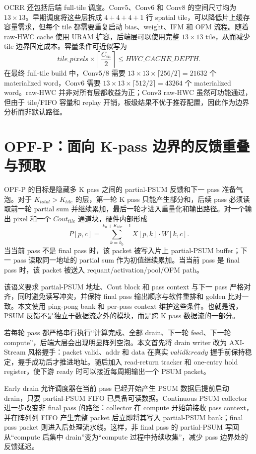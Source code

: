 OCRR 还包括后端 full-tile 调度。Conv5、Conv6 和 Conv8 的空间尺寸均为 $13\times13$。早期调度将这些层拆成 $4+4+4+1$ 行 spatial tile，可以降低片上缓存容量需求，但每个 tile 都需要重复启动 bias、weight、IFM 和 OFM 流程。随着 raw-HWC cache 使用 URAM 扩容，后端层可以使用完整 $13\times13$ tile，从而减少 tile 边界固定成本。容量条件可近似写为
\begin{equation}
tile\_pixels \times \left\lceil\frac{C_{in}}{2}\right\rceil \le HWC\_CACHE\_DEPTH.
\end{equation}
在最终 full-tile build 中，Conv5/8 需要 $13\times13\times\lceil256/2\rceil=21632$ 个 materialized word，Conv6 需要 $13\times13\times\lceil512/2\rceil=43264$ 个 materialized word。raw-HWC 并非对所有层都收益为正；Conv3 raw-HWC 虽然可功能通过，但由于 tile/FIFO 容量和 replay 开销，板级结果不优于推荐配置，因此作为边界分析而非默认路径。

\section{OPF-P：面向 K-pass 边界的反馈重叠与预取}

OPF-P 的目标是隐藏多 K pass 之间的 partial-PSUM 反馈和下一 pass 准备气泡。对于 $K_{total}>K_{tile}$ 的层，第一轮 K pass 只能产生部分和，后续 pass 必须读取前一轮 partial sum 并继续累加，最后一轮才进入重量化和输出路径。对一个输出 pixel 和一个 $Cout_{tile}$ 通道块，硬件内部形成
\begin{equation}
P[p,c] = \sum_{k=k_0}^{k_0+K_{tile}-1} X[p,k]\cdot W[k,c].
\end{equation}
当当前 pass 不是 final pass 时，该 packet 被写入片上 partial-PSUM buffer；下一 pass 读取同一地址的 partial sum 作为初值继续累加。当当前 pass 是 final pass 时，该 packet 被送入 requant/activation/pool/OFM path。

该语义要求 partial-PSUM 地址、Cout block 和 pass context 与下一 pass 严格对齐，同时避免读写冲突，并保持 final pass 输出顺序与软件重排和 golden 比对一致。本文使用 ping-pong bank 和 per-pass context 维护这些条件。也就是说，PSUM 反馈不是独立于数据流之外的模块，而是跨 K pass 数据流的一部分。

若每轮 pass 都严格串行执行“计算完成、全部 drain、下一轮 feed、下一轮 compute”，后端大层会出现明显阵列空泡。本文首先将 drain writer 改为 AXI-Stream 风格握手：packet valid、addr 和 data 在真实 $valid \& ready$ 握手前保持稳定，握手成功后才推进地址。随后加入 read-return tracker 和 one-entry hold register，使下游 ready 时可以接近每周期输出一个 PSUM packet。

Early drain 允许调度器在当前 pass 已经开始产生 PSUM 数据后提前启动 drain，只要 partial-PSUM FIFO 已具备可读数据。Continuous PSUM collector 进一步改变非 final pass 的路径：collector 在 compute 开始前接收 pass context，并在阵列列 FIFO 产生完整 packet 后立即将其写入 partial-PSUM bank；final pass packet 则进入后处理流水线。这样，非 final pass 的 partial-PSUM 写回从“compute 后集中 drain”变为“compute 过程中持续收集”，减少 pass 边界处的反馈延迟。

